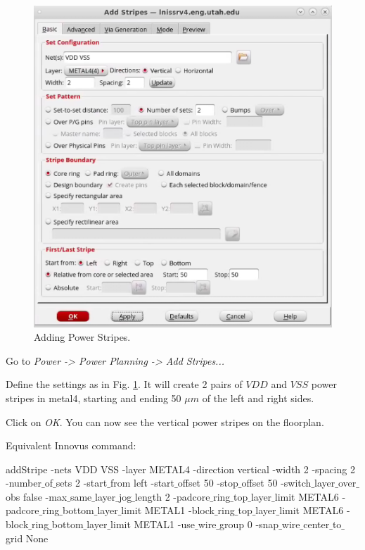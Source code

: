 \begin{enumerate}
	\parbox[t]{\dimexpr\textwidth-\leftmargin}{%
		\begin{figure}
			\vspace{0mm}
			\centering
			\vspace{-\baselineskip}
			\includegraphics[scale=0.4]{figures/lab5_backend/add_stripes}
			\caption{Adding Power Stripes.}
			\label{add_stripes}
		\end{figure}
	\item Go to \textit{Power -> Power Planning -> Add Stripes...}
\item Define the settings as in Fig. \ref{add_stripes}. It will create 2 pairs of $VDD$ and $VSS$ power stripes in metal4, starting and ending 50 $\mu$$m$ of the left and right sides. 
	\item Click on \textit{OK}.	You can now see the vertical power stripes on the floorplan.
	} 
\end{enumerate}
\vspace{170px}
Equivalent Innovus command:
\begin{codeline}
addStripe -nets {VDD VSS} -layer METAL4 -direction vertical -width 2 -spacing 2 -number$\_$of$\_$sets 2 -start$\_$from left -start$\_$offset 50 -stop$\_$offset 50 -switch$\_$layer$\_$over$\_$obs false -max$\_$same$\_$layer$\_$jog$\_$length 2 -padcore$\_$ring$\_$top$\_$layer$\_$limit METAL6 -padcore$\_$ring$\_$bottom$\_$layer$\_$limit METAL1 -block$\_$ring$\_$top$\_$layer$\_$limit METAL6 -block$\_$ring$\_$bottom$\_$layer$\_$limit METAL1 -use$\_$wire$\_$group 0 -snap$\_$wire$\_$center$\_$to$\_$grid None
\end{codeline}


